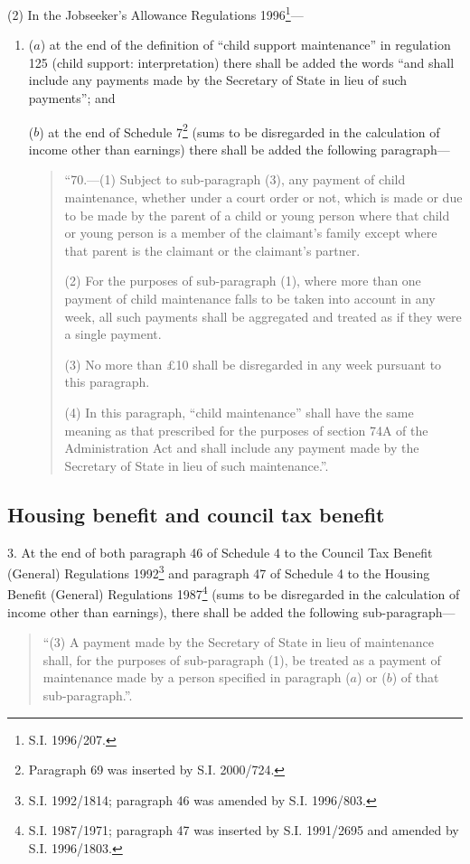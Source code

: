 \documentclass[12pt,a4paper]{article}
\begin{document}
(2) In the Jobseeker’s Allowance Regulations 1996\footnote{\frenchspacing S.I. 1996/207.}—
\begin{enumerate}\item[]
($a$) at the end of the definition of “child support maintenance” in regulation 125 (child support: interpretation) there shall be added the words “and shall include any payments made by the Secretary of State in lieu of such payments”; and

($b$) at the end of Schedule 7\footnote{\frenchspacing Paragraph 69 was inserted by S.I. 2000/724.} (sums to be disregarded in the calculation of income other than earnings) there shall be added the following paragraph—
\begin{quotation}
“70.---(1)  Subject to sub-paragraph (3), any payment of child maintenance, whether under a court order or not, which is made or due to be made by the parent of a child or young person where that child or young person is a member of the claimant’s family except where that parent is the claimant or the claimant’s partner.

(2) For the purposes of sub-paragraph (1), where more than one payment of child maintenance falls to be taken into account in any week, all such payments shall be aggregated and treated as if they were a single payment.

(3) No more than £10 shall be disregarded in any week pursuant to this paragraph.

(4) In this paragraph, “child maintenance” shall have the same meaning as that prescribed for the purposes of section 74A of the Administration Act and shall include any payment made by the Secretary of State in lieu of such maintenance.”.
\end{quotation}
\end{enumerate}

\subsection[3. Housing benefit and council tax benefit]{Housing benefit and council tax benefit}

3.  At the end of both paragraph 46 of Schedule 4 to the Council Tax Benefit (General) Regulations 1992\footnote{\frenchspacing S.I. 1992/1814; paragraph 46 was amended by S.I. 1996/803.} and paragraph 47 of Schedule 4 to the Housing Benefit (General) Regulations 1987\footnote{\frenchspacing S.I. 1987/1971; paragraph 47 was inserted by S.I. 1991/2695 and amended by S.I. 1996/1803.} (sums to be disregarded in the calculation of income other than earnings), there shall be added the following sub-paragraph—
\begin{quotation}
“(3) A payment made by the Secretary of State in lieu of maintenance shall, for the purposes of sub-paragraph (1), be treated as a payment of maintenance made by a person specified in paragraph ($a$)  or ($b$)  of that sub-paragraph.”.
\end{quotation}
\end{document}
